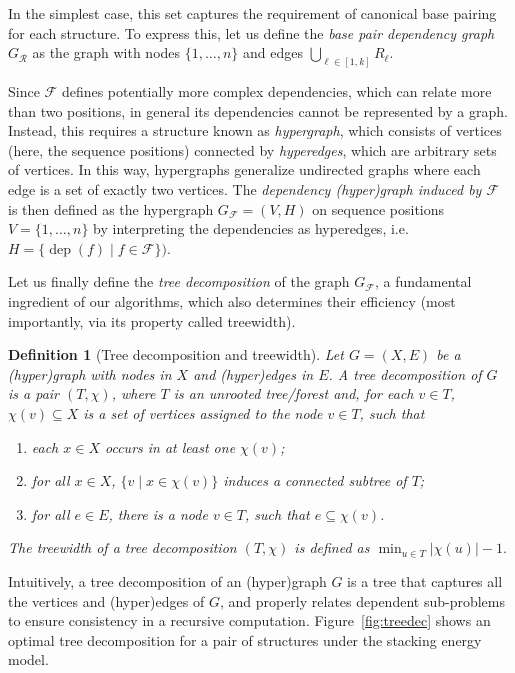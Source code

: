 \documentclass[]{bmcart}
\newtheorem{definition}[theorem]{Definition}
\newcommand{\dep}{\operatorname{dep}}
\newcommand{\F}{\mathcal{F}}
\newcommand{\R}{\mathcal{R}}
\newcommand{\Def}[1]{\emph{#1}}
\newcommand{\revised}[1]{{\color{red} #1}}
\begin{document}
\revised{
In the simplest case, this set captures the requirement of canonical base pairing for each structure.
To express this, let us define the \Def{base pair dependency graph} $G_{\R}$ as the graph with nodes $\{1,\dots,n\}$
and edges $\bigcup_{\ell\in[1,k]} R_\ell$. %

Since $\F$ defines potentially more complex dependencies, which can
relate more than two positions, in general its dependencies cannot be 
represented by a graph. Instead, this requires a structure known as
\Def{hypergraph}, which consists of vertices (here, the sequence
positions) connected by \Def{hyperedges}, which are arbitrary sets of
vertices. In this way, hypergraphs generalize undirected graphs where
each edge is a set of exactly two vertices.
%
The \Def{dependency (hyper)graph induced by $\F$} is then defined as the hypergraph $G_\F=(V, H)$ on sequence positions $V=\{1,\dots,n\}$
by interpreting the dependencies as hyperedges, i.e. $H =
\{\dep(f)\mid f\in \F\})$.

Let us finally define the \Def{tree decomposition} of the graph $G_\F$, a fundamental ingredient of our algorithms, which also determines their efficiency (most importantly, via its property called treewidth).
}
\begin{definition}[Tree decomposition and treewidth]
  \label{def:treedecomp}
  Let $G=(X, E)$ be a (hyper)graph with nodes in $X$ and (hyper)edges in $E$. A \Def{tree decomposition} of $G$ is
  a pair $(T,\chi)$, where $T$ is an unrooted tree/forest and, for
  each $v\in T$, $\chi(v)\subseteq X$ is a set of vertices assigned to
  the node $v\in T$, such that
\begin{enumerate}
\item each $x\in X$ occurs in at least one $\chi(v)$;
\item for all $x\in X$, $\{ v \mid x \in \chi(v) \}$ induces a connected subtree of $T$;
\item for all $e\in E$, there is a node $v\in T$, such that $e\subseteq\chi(v)$.
\end{enumerate}

\smallskip
\noindent
The \Def{treewidth} of a tree decomposition $(T,\chi)$ is defined as
$\min_{u\in T} |\chi(u)| - 1.$ 
\end{definition}
%
\revised{Intuitively, a tree decomposition of an (hyper)graph $G$ is a tree that captures all the vertices and (hyper)edges of $G$, and properly relates dependent sub-problems to ensure consistency in a recursive computation. Figure~\ref{fig:treedec} shows an optimal tree decomposition for a pair of structures under the stacking energy model.}
\end{document}
